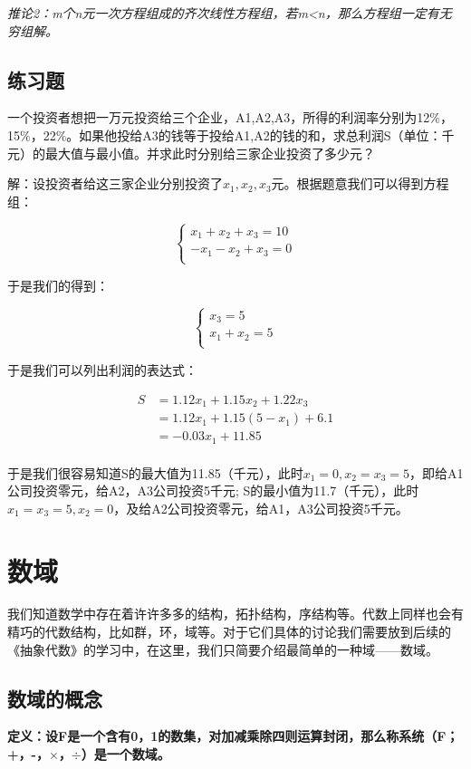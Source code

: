 \documentclass[a4paper]{ctexart}
\begin{document}
\textit{推论2：m个n元一次方程组成的齐次线性方程组，若m<n，那么方程组一定有无穷组解。}

\subsection{练习题}

一个投资者想把一万元投资给三个企业，A1,A2,A3，所得的利润率分别为12$\%$，15$\%$，22$\%$。如果他投给A3的钱等于投给A1,A2的钱的和，求总利润S（单位：千元）的最大值与最小值。并求此时分别给三家企业投资了多少元？

解：设投资者给这三家企业分别投资了$x_{1},x_{2},x_{3}$元。根据题意我们可以得到方程组：

$$
\begin{cases}
x_{1}+x_{2}+x_{3}=10\\
-x_{1}-x_{2}+x_{ 3}=0\\
\end{cases}
$$

于是我们的得到：

$$
\begin{cases}
x_{3}=5\\
x_{1}+x_{2}=5\\
\end{cases}
$$

于是我们可以列出利润的表达式：

$$
\begin{aligned}
S&=1.12x_{1}+1.15x_{2}+1.22x_{3}\\
  &=1.12x_{1}+1.15(5-x_{1})+6.1\\
  &=-0.03x_{1}+11.85\\
\end{aligned}
$$

 于是我们很容易知道S的最大值为11.85（千元），此时$x_{1}=0,x_{2}=x_{3}=5$，即给A1公司投资零元，给A2，A3公司投资5千元;
 S的最小值为11.7（千元），此时$x_{1}=x_{3}=5,x_{2}=0$，及给A2公司投资零元，给A1，A3公司投资5千元。
 
\section{数域}
我们知道数学中存在着许许多多的结构，拓扑结构，序结构等。代数上同样也会有精巧的代数结构，比如群，环，域等。对于它们具体的讨论我们需要放到后续的《抽象代数》的学习中，在这里，我们只简要介绍最简单的一种域——数域。

\subsection{数域的概念}
\textbf{定义：设F是一个含有0，1的数集，对加减乘除四则运算封闭，那么称系统（F；+，-，$\times$，$\div$）是一个数域。}
\end{document}

